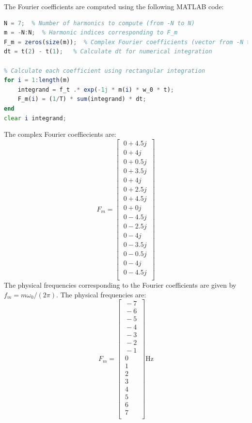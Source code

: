 \documentclass[12pt]{article}
\begin{document}
The Fourier coefficients are computed using the following MATLAB code:
\begin{lstlisting}[language=Octave, caption=MATLAB Script to Compute Fourier Coefficients]
N = 7;  % Number of harmonics to compute (from -N to N)
m = -N:N;  % Harmonic indices corresponding to F_m 
F_m = zeros(size(m));  % Complex Fourier coefficients (vector from -N to N) 
dt = t(2) - t(1);   % Calculate dt for numerical integration
    
% Calculate each coefficient using rectangular integration
for i = 1:length(m)
    integrand = f_t .* exp(-1j * m(i) * w_0 * t);
    F_m(i) = (1/T) * sum(integrand) * dt; 
end
clear i integrand;
\end{lstlisting}

The complex Fourier coeffiecients are:
\[ F_m = \begin{bmatrix}
    \ 0 + 4.5j \ \\
    \ 0 + 4j \ \\
    \ 0 + 0.5j \ \\
    \ 0 + 3.5j \ \\
    \ 0 + 4j \ \\
    \ 0 + 2.5j \ \\
    \ 0 + 4.5j \ \\
    \ 0 + 0j \ \\
    \ 0 - 4.5j \ \\
    \ 0 - 2.5j \ \\
    \ 0 - 4j \ \\
    \ 0 - 3.5j \ \\
    \ 0 - 0.5j \ \\
    \ 0 - 4j \ \\
    \ 0 - 4.5j \ \\
    \end{bmatrix} \]
The physical frequencies corresponding to the Fourier coefficients are given by $f_m = m \omega_0 / (2\pi)$.
The physical frequencies are:
\[ F_m = \begin{bmatrix}
    \ -7 \ \\
    \ -6 \ \\
    \ -5 \ \\
    \ -4 \ \\
    \ -3 \ \\
    \ -2 \ \\
    \ -1 \ \\
    \ 0 \ \\
    \ 1 \ \\
    \ 2 \ \\
    \ 3 \ \\
    \ 4 \ \\
    \ 5 \ \\
    \ 6 \ \\
    \ 7 \ \\
    \end{bmatrix} \text{Hz} \]
\end{document}
